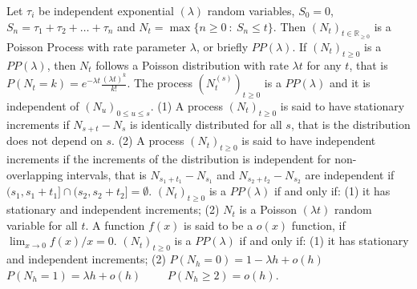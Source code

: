  Let $\tau_i$ be independent exponential $(\lambda)$ random variables, $S_0 = 0$, $S_n = \tau_1 + \tau_2 + \ldots + \tau_n$ and $N_t = \max\{n \ge 0\ :\ S_n \le t\}$. Then $(N_t)_{t \in \mathbb{R}_{\ge 0}}$ is a Poisson Process with rate parameter $\lambda$, or briefly $PP(\lambda)$.
 If $(N_t)_{t \ge 0}$ is a $PP(\lambda)$, then $N_t$ follows a Poisson distribution with rate $\lambda t$ for any $t$, that is $P(N_t = k) = e^{-\lambda t}\frac{(\lambda t)^k}{k!}$.
 The process $(N^{(s)}_t)_{t \ge 0}$ is a $PP(\lambda)$ and it is independent of $(N_u)_{0 \le u \le s}$.
(1) A process $(N_t)_{t \ge 0}$  is said to have stationary increments if $N_{s+t} - N_s$ is identically distributed for all $s$, that is the distribution does not depend on $s$.
(2) A process $(N_t)_{t \ge 0}$ is said to have independent increments if the increments of the distribution is independent for non-overlapping intervals, that is $N_{s_1 + t_1} - N_{s_1}$ and $N_{s_2 + t_2} -N_{s_2}$ are independent if $(s_1,s_1 + t_1] \cap (s_2,s_2 + t_2] = \emptyset$.
 $(N_t)_{t \ge 0}$ is a $PP(\lambda)$ if and only if: 
(1) it has stationary and independent increments; 
(2) $N_t$ is a Poisson $(\lambda t)$ random variable for all $t$.
 A function $f(x)$ is said to be a $o(x)$ function, if $\lim_{x \to 0} f(x)/x = 0$.
 $(N_t)_{t \ge 0}$ is a $PP(\lambda)$ if and only if: 
(1) it has stationary and independent increments;
(2) $P(N_h = 0) = 1 -\lambda h +o(h) \qquad$ 
$P(N_h = 1) = \lambda h + o(h) \qquad$ 
$P(N_h \ge 2) = o(h)$.